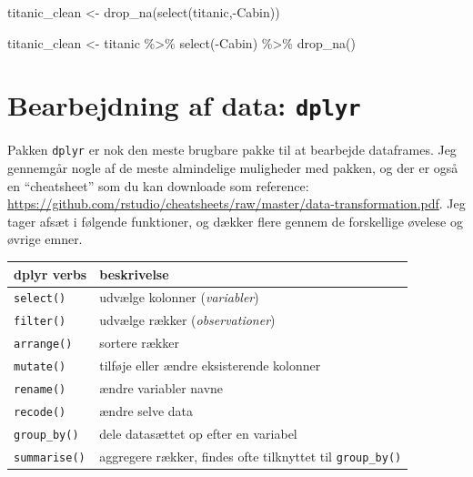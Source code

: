\documentclass[
]{book}
\newenvironment{Shaded}{\begin{snugshade}}{\end{snugshade}}
\newcommand{\FunctionTok}[1]{\textcolor[rgb]{0.00,0.00,0.00}{#1}}
\newcommand{\NormalTok}[1]{#1}
\newcommand{\OtherTok}[1]{\textcolor[rgb]{0.56,0.35,0.01}{#1}}
\newcommand{\SpecialCharTok}[1]{\textcolor[rgb]{0.00,0.00,0.00}{#1}}
\begin{document}
\begin{Shaded}
\begin{Highlighting}[]
\NormalTok{titanic\_clean }\OtherTok{\textless{}{-}} \FunctionTok{drop\_na}\NormalTok{(}\FunctionTok{select}\NormalTok{(titanic,}\SpecialCharTok{{-}}\NormalTok{Cabin))}

\NormalTok{titanic\_clean }\OtherTok{\textless{}{-}}\NormalTok{ titanic }\SpecialCharTok{\%\textgreater{}\%} 
    \FunctionTok{select}\NormalTok{(}\SpecialCharTok{{-}}\NormalTok{Cabin) }\SpecialCharTok{\%\textgreater{}\%}
    \FunctionTok{drop\_na}\NormalTok{() }
\end{Highlighting}
\end{Shaded}

\hypertarget{bearbejdning-af-data-dplyr}{%
\section{\texorpdfstring{Bearbejdning af data: \texttt{dplyr}}{Bearbejdning af data: dplyr}}\label{bearbejdning-af-data-dplyr}}

Pakken \texttt{dplyr} er nok den meste brugbare pakke til at bearbejde dataframes. Jeg gennemgår nogle af de meste almindelige muligheder med pakken, og der er også en ``cheatsheet'' som du kan downloade som reference: \url{https://github.com/rstudio/cheatsheets/raw/master/data-transformation.pdf}. Jeg tager afsæt i følgende funktioner, og dækker flere gennem de forskellige øvelese og øvrige emner.

\begin{longtable}[]{@{}ll@{}}
\toprule
dplyr verbs & beskrivelse \\
\midrule
\endhead
\texttt{select()} & udvælge kolonner (\emph{variabler}) \\
\texttt{filter()} & udvælge rækker (\emph{observationer}) \\
\texttt{arrange()} & sortere rækker \\
\texttt{mutate()} & tilføje eller ændre eksisterende kolonner \\
\texttt{rename()} & ændre variabler navne \\
\texttt{recode()} & ændre selve data \\
\texttt{group\_by()} & dele datasættet op efter en variabel \\
\texttt{summarise()} & aggregere rækker, findes ofte tilknyttet til \texttt{group\_by()} \\
\bottomrule
\end{longtable}
\end{document}
